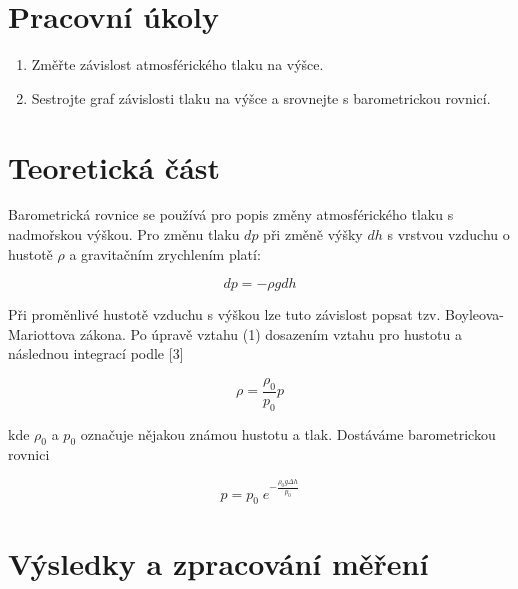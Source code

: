 \section{Pracovní úkoly}

\begin{enumerate}
\item Změřte závislost atmosférického tlaku na výšce.

\item Sestrojte graf závislosti tlaku na výšce a srovnejte s barometrickou rovnicí.

\end{enumerate}

\section{Teoretická část}

Barometrická rovnice se používá pro popis změny atmosférického tlaku s nadmořskou výškou. Pro změnu tlaku $dp$ při změně výšky $dh$ s vrstvou vzduchu o hustotě $\rho$ a gravitačním zrychlením platí:

\begin{equation}
    dp = - \rho g dh
\end{equation}

Při proměnlivé hustotě vzduchu s výškou lze tuto závislost popsat tzv. Boyleova-Mariottova zákona. Po úpravě vztahu (1) dosazením vztahu pro hustotu a následnou integrací podle [3]

\begin{equation}
    \rho = \frac{\rho_0}{p_0}p
\end{equation}

kde $\rho_0$ a $p_0$ označuje nějakou známou hustotu a tlak. Dostáváme barometrickou rovnici

\begin{equation}
    p = p_0 \; e ^ {-\frac{\rho_0 g \Delta h}{p_0}}
\end{equation}

\section{Výsledky a zpracování měření}

